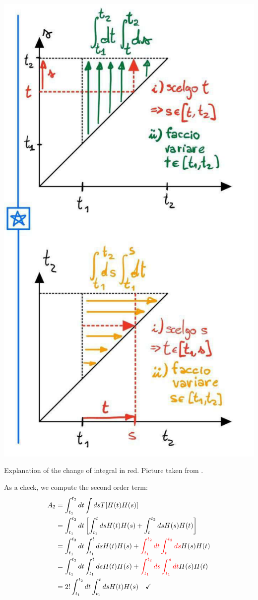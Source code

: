\documentclass[../main.tex]{subfiles}
\begin{document}
\begin{marginfigure}
\includegraphics{Images/papaintegrale.pdf}
\caption{Explanation of the change of integral in red. Picture taken from \cite{PapaNotes}.}
\end{marginfigure}
\begin{kaobox}[frametitle=Check]
As a check, we compute the second order term:
\begin{align*}
A_2&=\int_{t_1}^{t_2}dt\int dsT[H(t)H(s)]\\
&=\int_{t_1}^{t_2}dt\left[\int_{t_1}^tdsH(t)H(s)+\int_t^{t_2}dsH(s)H(t)\right]\\
&=\int_{t_1}^{t_2}dt\int_{t_1}^tdsH(t)H(s)+{\color{red}\int_{t_1}^{t_2}dt\int_t^{t_2}ds}H(s)H(t)\\
&=\int_{t_1}^{t_2}dt\int_{t_1}^tdsH(t)H(s)+{\color{red}\int_{t_1}^{t_2}ds\int_{t_1}^sdt}H(s)H(t)\\
&=2!\int_{t_1}^{t_2}dt\int_{t_1}^tdsH(t)H(s) \quad \checkmark
\end{align*}
\end{kaobox}
\end{document}
